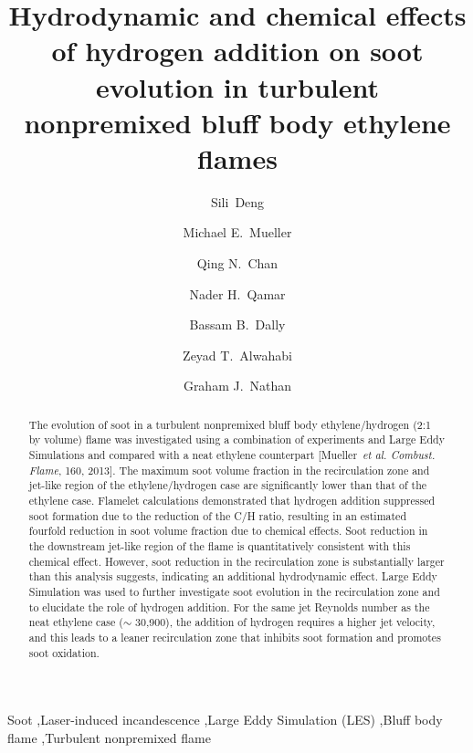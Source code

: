 \documentclass[review,3p,times]{elsarticle}
\begin{document}
\begin{frontmatter}

\title{Hydrodynamic and chemical effects of hydrogen addition on soot evolution in turbulent nonpremixed bluff body ethylene flames}

\author[Princeton]{Sili~Deng}
\author[Princeton]{Michael E.~Mueller}
\author[NSW]{Qing N.~Chan}
\author[FCT]{Nader H.~Qamar}
\author[Adelaide]{Bassam B.~Dally}
\author[Adelaide]{Zeyad T.~Alwahabi}
\author[Adelaide]{Graham J.~Nathan}

\address[Princeton]{Department of Mechanical and Aerospace Engineering, Princeton University, Princeton, USA}
\address[NSW]{School of Mechanical and Manufacturing Engineering, The University of New South Wales, Australia}
\address[FCT]{FCT-Combustion, Australia}
\address[Adelaide]{Centre for Energy Technology, The University of Adelaide, Australia}

\begin{abstract}

The evolution of soot in a turbulent nonpremixed bluff body ethylene/hydrogen (2:1 by volume) flame was investigated using a combination of experiments and Large Eddy Simulations and compared with a neat ethylene counterpart [Mueller~\emph{et al. Combust. Flame}, 160, 2013].  The maximum soot volume fraction in the recirculation zone and jet-like region of the ethylene/hydrogen case are significantly lower than that of the ethylene case.  Flamelet calculations demonstrated that hydrogen addition suppressed soot formation due to the reduction of the C/H ratio, resulting in an estimated fourfold reduction in soot volume fraction due to chemical effects.  Soot reduction in the downstream jet-like region of the flame is quantitatively consistent with this chemical effect.  However, soot reduction in the recirculation zone is substantially larger than this analysis suggests, indicating an additional hydrodynamic effect.  Large Eddy Simulation was used to further investigate soot evolution in the recirculation zone and to elucidate the role of hydrogen addition.  For the same jet Reynolds number as the neat ethylene case ($\sim$ 30,900), the addition of hydrogen requires a higher jet velocity, and this leads to a leaner recirculation zone that inhibits soot formation and promotes soot oxidation.

\end{abstract}

\begin{keyword} 
Soot \sep Laser-induced incandescence \sep Large Eddy Simulation (LES) \sep Bluff body flame \sep Turbulent nonpremixed flame 
\end{keyword}

\end{frontmatter}
\end{document}
